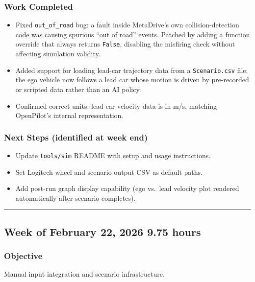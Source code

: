 \documentclass[12pt]{article}
\begin{document}
\subsubsection{Work Completed}
\begin{itemize}
  \item Fixed \texttt{out\_of\_road} bug: a fault inside MetaDrive's own collision-detection code was causing spurious ``out of road'' events. Patched by adding a function override that always returns \texttt{False}, disabling the misfiring check without affecting simulation validity.
  \item Added support for loading lead-car trajectory data from a \texttt{Scenario.csv} file; the ego vehicle now follows a lead car whose motion is driven by pre-recorded or scripted data rather than an AI policy.
  \item Confirmed correct units: lead-car velocity data is in m/s, matching OpenPilot's internal representation.
\end{itemize}

\subsubsection{Next Steps (identified at week end)}
\begin{itemize}
  \item Update \texttt{tools/sim} README with setup and usage instructions.
  \item Set Logitech wheel and scenario output CSV as default paths.
  \item Add post-run graph display capability (ego vs.\ lead velocity plot rendered automatically after scenario completes).
\end{itemize}

\hrule\vspace{0.5em}

\subsection{Week of February 22, 2026 \hfill \normalfont\small 9.75 hours}

\subsubsection{Objective}
Manual input integration and scenario infrastructure.
\end{document}
